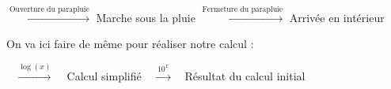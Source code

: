 \documentclass[a4paper, twoside]{article}
\begin{document}
	\vspace{-0.15cm}

	\begin{center}
		 $\xrightarrow{\text{Ouverture du parapluie}}$ {\small Marche sous la pluie} $\xrightarrow{\text{Fermeture du parapluie}}$ {\small Arrivée en intérieur}\\
	\end{center}

	\vspace{0.1cm}

	On va ici faire de même pour réaliser notre calcul : 

	\vspace{-0.15cm}

	\begin{center}
		 ~ $\xrightarrow{\log(x)}$ ~ {\small Calcul simplifié} ~ $\xrightarrow{10^x}$ ~ {\small Résultat du calcul initial}\\
	\end{center}

	\vspace{1cm}
\end{document}
